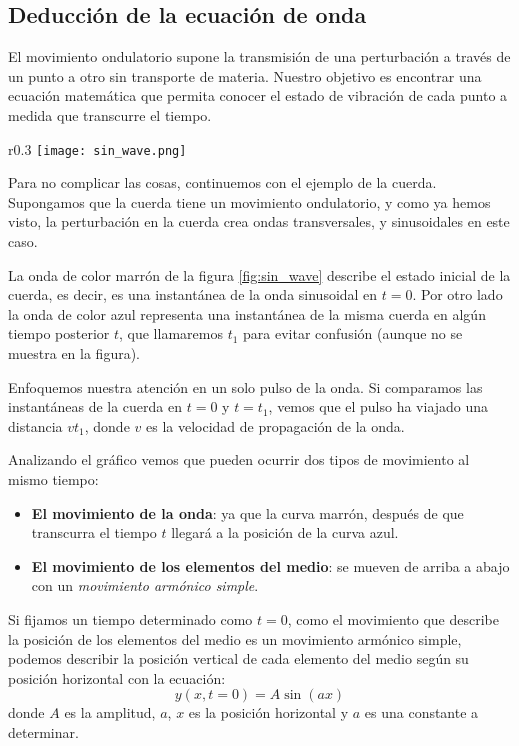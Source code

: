 \subsection{Deducción de la ecuación de onda}

El movimiento ondulatorio supone la transmisión de una perturbación a través de un punto a otro sin transporte de materia. Nuestro objetivo es encontrar una ecuación matemática que permita conocer el estado de vibración de cada punto a medida que transcurre el tiempo.

\begin{wrapfigure}{r}{0.3\textwidth}
  \centering
  \texttt{[image: sin\_wave.png]}
  \caption{Onda sinusoidal que viaja hacia la derecha con una rapidez \(v\).}
  \label{fig:sin_wave}
\end{wrapfigure}
Para no complicar las cosas, continuemos con el ejemplo de la cuerda. Supongamos que la cuerda tiene un movimiento ondulatorio, y como ya hemos visto, la perturbación en la cuerda crea ondas transversales, y sinusoidales en este caso. 

La onda de color marrón de la figura \ref{fig:sin_wave} describe el estado inicial de la cuerda, es decir, es una instantánea de la onda sinusoidal en \(t=0\). Por otro lado la onda de color azul representa una instantánea de la misma cuerda en algún tiempo posterior \(t\), que llamaremos \(t_1\) para evitar confusión (aunque no se muestra en la figura).

Enfoquemos nuestra atención en un solo pulso de la onda. Si comparamos las instantáneas de la cuerda en \(t=0\) y \(t=t_1\), vemos que el pulso ha viajado una distancia \(v t_1\), donde \(v\) es la velocidad de propagación de la onda. 

Analizando el gráfico vemos que pueden ocurrir dos tipos de movimiento al mismo tiempo:
\begin{itemize}
  \item \textbf{El movimiento de la onda}: ya que la curva marrón, después de que transcurra el tiempo \(t\) llegará a la posición de la curva azul.
  \item \textbf{El movimiento de los elementos del medio}: se mueven de arriba a abajo con un \textit{movimiento armónico simple}. 
\end{itemize}

Si fijamos un tiempo determinado como \(t=0\), como el movimiento que describe la posición de los elementos del medio es un movimiento armónico simple, podemos describir la posición vertical de cada elemento del medio según su posición horizontal con la ecuación:
\[
  y(x, t=0) = A \sin(ax)
\]
donde \(A\) es la amplitud, \(a\), \(x\) es la posición horizontal y \(a\) es una constante a determinar. 

